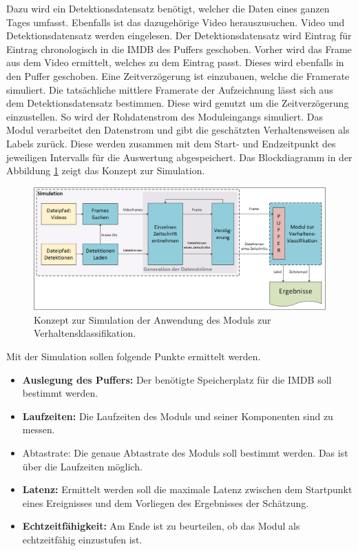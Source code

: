 Dazu wird ein Detektionsdatensatz benötigt, welcher die Daten eines ganzen Tages umfasst. Ebenfalls ist das dazugehörige Video herauszusuchen. Video und Detektionsdatensatz werden eingelesen. Der Detektionsdatensatz wird Eintrag für Eintrag chronologisch in die \gls{IMDB} des Puffers geschoben. Vorher wird das Frame aus dem Video ermittelt, welches zu dem Eintrag passt. Dieses wird ebenfalls in den Puffer geschoben. Eine Zeitverzögerung ist einzubauen, welche die Framerate simuliert. Die tatsächliche mittlere Framerate der Aufzeichnung lässt sich aus dem Detektionsdatensatz bestimmen. Diese wird genutzt um die Zeitverzögerung einzustellen. So wird der Rohdatenstrom des Moduleingangs simuliert. Das Modul verarbeitet den Datenstrom und gibt die geschätzten Verhaltensweisen als Labels zurück. Diese werden zusammen mit dem Start- und Endzeitpunkt des jeweiligen Intervalls für die Auswertung abgespeichert. Das Blockdiagramm in der Abbildung \ref{fig:ModulKonzeptSim} zeigt das Konzept zur Simulation. 

\begin{figure}[htb]
    \centering
    \includegraphics[width=\textwidth]{img/Grafiken/Konzept Simultaion.png}
    \caption[Konzept zur Simulation der Anwendung des Moduls zur Verhaltensklassifikation.]{Konzept zur Simulation der Anwendung des Moduls zur Verhaltensklassifikation.}
    \label{fig:ModulKonzeptSim}
\end{figure}

Mit der Simulation sollen folgende Punkte ermittelt werden.

\begin{itemize}
    \item \textbf{Auslegung des Puffers:} Der benötigte Speicherplatz für die \gls{IMDB} soll bestimmt werden.
    \item \textbf{Laufzeiten:} Die Laufzeiten des Moduls und seiner Komponenten sind zu messen.
    \item Abtastrate:\textbf{} Die genaue Abtastrate des Moduls soll bestimmt werden. Das ist über die Laufzeiten möglich.
    \item \textbf{Latenz:} Ermittelt werden soll die maximale Latenz zwischen dem Startpunkt eines Ereignisses und dem Vorliegen des Ergebnisses der Schätzung.
    \item \textbf{Echtzeitfähigkeit:} Am Ende ist zu beurteilen, ob das Modul als echtzeitfähig einzustufen ist.
\end{itemize}
